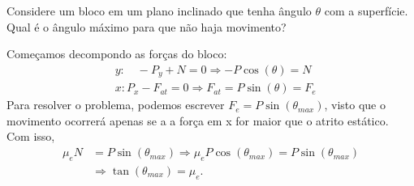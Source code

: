 \documentclass[PhysicsI/physics_notes.tex]{subfiles}
\begin{document}
\begin{example}
	Considere um bloco em um plano inclinado que tenha ângulo $\theta $ com a superfície. Qual é o ângulo máximo para que não haja movimento?

	Começamos decompondo as forças do bloco:
	\begin{align*}
		 & y:\quad -P_{y} + N = 0 \Rightarrow -P\cos{(\theta )} = N            \\
		 & x: P_{x} - F_{at} = 0 \Rightarrow F_{at} = P\sin{(\theta )} = F_{e}
	\end{align*}
	Para resolver o problema, podemos escrever $F_{e} = P\sin{(\theta_{max} )}$, visto que o movimento ocorrerá
	apenas se a a força em x for maior que o atrito estático. Com isso,
	\begin{align*}
		\mu_{e}N & = P\sin{(\theta_{max})} \Rightarrow \mu_{e}P\cos{(\theta_{max})} = P\sin{(\theta_{max})} \\
		         & \Rightarrow \tan{(\theta_{max})} = \mu_{e}.
	\end{align*}
\end{example}
\end{document}
